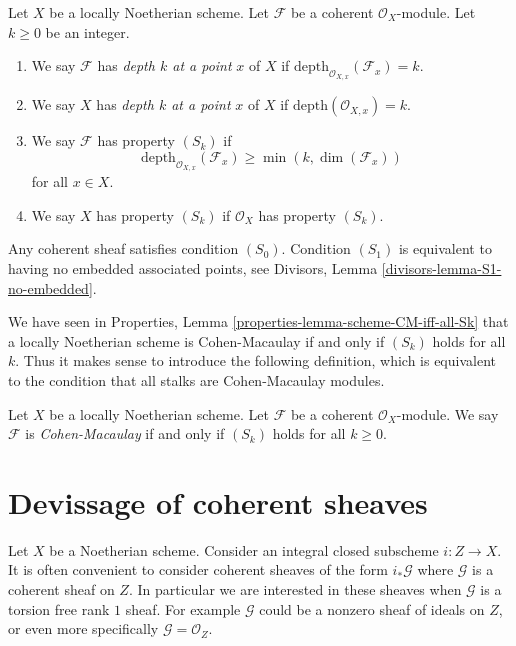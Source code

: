 \begin{definition}
\label{definition-depth}
Let $X$ be a locally Noetherian scheme.
Let $\mathcal{F}$ be a coherent $\mathcal{O}_X$-module.
Let $k \geq 0$ be an integer.
\begin{enumerate}
\item We say $\mathcal{F}$ has {\it depth $k$ at a point}
$x$ of $X$ if $\text{depth}_{\mathcal{O}_{X, x}}(\mathcal{F}_x) = k$.
\item We say $X$ has {\it depth $k$ at a point} $x$ of $X$ if
$\text{depth}(\mathcal{O}_{X, x}) = k$.
\item We say $\mathcal{F}$ has property {\it $(S_k)$} if
$$
\text{depth}_{\mathcal{O}_{X, x}}(\mathcal{F}_x)
\geq \min(k, \dim(\mathcal{F}_x))
$$
for all $x \in X$.
\item We say $X$ has property {\it $(S_k)$} if $\mathcal{O}_X$ has
property $(S_k)$.
\end{enumerate}
\end{definition}

\noindent
Any coherent sheaf satisfies condition $(S_0)$.
Condition $(S_1)$ is equivalent to having no embedded associated
points, see Divisors, Lemma \ref{divisors-lemma-S1-no-embedded}.

\medskip\noindent
We have seen in Properties, Lemma \ref{properties-lemma-scheme-CM-iff-all-Sk}
that a locally Noetherian
scheme is Cohen-Macaulay if and only if $(S_k)$ holds for all $k$.
Thus it makes sense to introduce the following definition, which
is equivalent to the condition that all stalks are Cohen-Macaulay modules.

\begin{definition}
\label{definition-Cohen-Macaulay}
Let $X$ be a locally Noetherian scheme.
Let $\mathcal{F}$ be a coherent $\mathcal{O}_X$-module.
We say $\mathcal{F}$ is {\it Cohen-Macaulay} if and only
if $(S_k)$ holds for all $k \geq 0$.
\end{definition}











\section{Devissage of coherent sheaves}
\label{section-devissage}

\noindent
Let $X$ be a Noetherian scheme. Consider an integral closed subscheme
$i : Z \to X$. It is often convenient to consider coherent sheaves of
the form $i_*\mathcal{G}$ where $\mathcal{G}$ is a coherent sheaf on
$Z$. In particular we are interested in these sheaves when $\mathcal{G}$
is a torsion free rank $1$ sheaf. For example $\mathcal{G}$ could be
a nonzero sheaf of ideals on $Z$, or even more specifically
$\mathcal{G} = \mathcal{O}_Z$.

